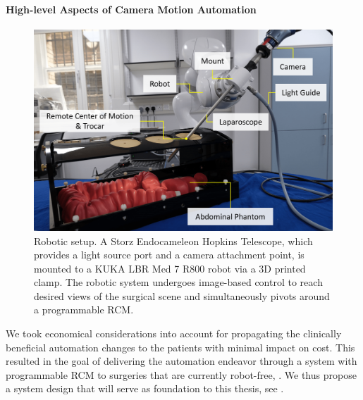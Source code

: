 \paragraph{High-level Aspects of Camera Motion Automation}
\begin{figure}[htb]
	\centering
	\includegraphics[width=\textwidth]{chapter_2/img/labeled_setup_compressed.png}
	\caption{Robotic setup. A Storz Endocameleon Hopkins Telescope, which provides a light source port and a camera attachment point, is mounted to a KUKA LBR Med 7 R800 robot via a 3D printed clamp. The robotic system undergoes image-based control to reach desired views of the surgical scene and simultaneously pivots around a programmable RCM.}
	\label{in:fig:experimental_setup}
\end{figure}
We took economical considerations into account for propagating the clinically beneficial automation changes to the patients with minimal impact on cost. This resulted in the goal of delivering the automation endeavor through a system with programmable RCM to surgeries that are currently robot-free, . We thus propose a system design that will serve as foundation to this thesis, see .

